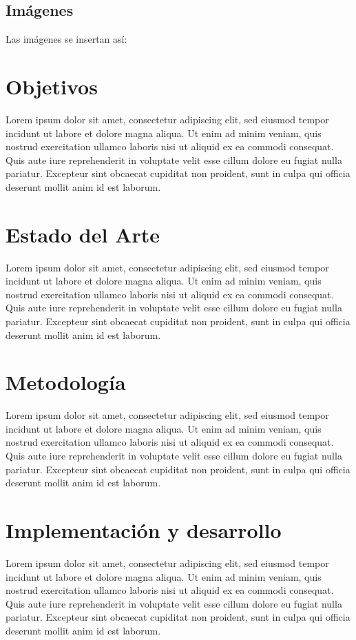 \documentclass[12pt,a4paper,twoside]{book}
\begin{document}
\section{Imágenes}
Las imágenes se insertan así:



\chapter{Objetivos}
Lorem ipsum dolor sit amet, consectetur adipiscing elit, sed eiusmod tempor incidunt ut labore et dolore magna aliqua. Ut enim ad minim veniam, quis nostrud exercitation ullamco laboris nisi ut aliquid ex ea commodi consequat. Quis aute iure reprehenderit in voluptate velit esse cillum dolore eu fugiat nulla pariatur. Excepteur sint obcaecat cupiditat non proident, sunt in culpa qui officia deserunt mollit anim id est laborum.

\chapter{Estado del Arte}
Lorem ipsum dolor sit amet, consectetur adipiscing elit, sed eiusmod tempor incidunt ut labore et dolore magna aliqua. Ut enim ad minim veniam, quis nostrud exercitation ullamco laboris nisi ut aliquid ex ea commodi consequat. Quis aute iure reprehenderit in voluptate velit esse cillum dolore eu fugiat nulla pariatur. Excepteur sint obcaecat cupiditat non proident, sunt in culpa qui officia deserunt mollit anim id est laborum.

\chapter{Metodología}
Lorem ipsum dolor sit amet, consectetur adipiscing elit, sed eiusmod tempor incidunt ut labore et dolore magna aliqua. Ut enim ad minim veniam, quis nostrud exercitation ullamco laboris nisi ut aliquid ex ea commodi consequat. Quis aute iure reprehenderit in voluptate velit esse cillum dolore eu fugiat nulla pariatur. Excepteur sint obcaecat cupiditat non proident, sunt in culpa qui officia deserunt mollit anim id est laborum.

\chapter{Implementación y desarrollo}
Lorem ipsum dolor sit amet, consectetur adipiscing elit, sed eiusmod tempor incidunt ut labore et dolore magna aliqua. Ut enim ad minim veniam, quis nostrud exercitation ullamco laboris nisi ut aliquid ex ea commodi consequat. Quis aute iure reprehenderit in voluptate velit esse cillum dolore eu fugiat nulla pariatur. Excepteur sint obcaecat cupiditat non proident, sunt in culpa qui officia deserunt mollit anim id est laborum.
\end{document}
